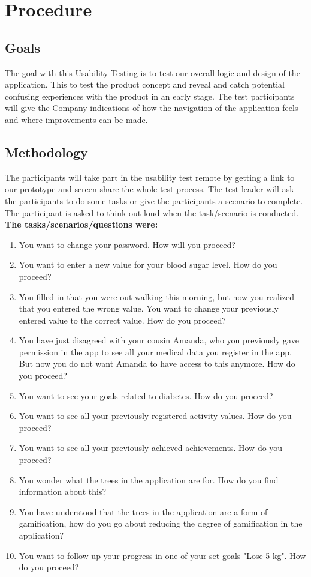 \chapter{Procedure}
\section{Goals}
The goal with this Usability Testing is to test our overall logic and design of the application. This to test the product concept and reveal and catch potential confusing experiences with the product in an early stage. The test participants will give the Company indications of how the navigation of the application feels and where improvements can be made.
\section{Methodology}
The participants will take part in the usability test remote by getting a link to our prototype and screen share the whole test process. The test leader will ask the participants to do some tasks or give the participants a scenario to complete. The participant is asked to think out loud when the task/scenario is conducted. \\

\noindent\textbf{The tasks/scenarios/questions were:}

\begin{enumerate}
\item You want to change your password. How will you proceed? 
\item You want to enter a new value for your blood sugar level. How do you proceed? 
\item You filled in that you were out walking this morning, but now you realized that you entered the wrong value. You want to change your previously entered value to the correct value. How do you proceed?
\item You have just disagreed with your cousin Amanda, who you previously gave permission in the app to see all your medical data you register in the app. But now you do not want Amanda to have access to this anymore. How do you proceed? 
\item You want to see your goals related to diabetes. How do you proceed? 
\item  You want to see all your previously registered activity values. How do you proceed?  
\item You want to see all your previously achieved achievements. How do you proceed?
\item You wonder what the trees in the application are for. How do you find information about this?
\item You have understood that the trees in the application are a form of gamification, how do you go about reducing the degree of gamification in the application?
\item You want to follow up your progress in one of your set goals "Lose 5 kg". How do you proceed? \\
\end{enumerate} 

